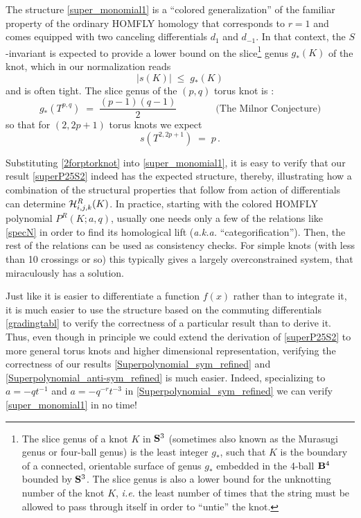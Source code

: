 \documentclass[hyper,letterpaper]{JHEP3}
\newcommand{\be}{\begin{equation}}
\newcommand{\ee}{\end{equation}}
\newcommand{\cH}{{\cal H }}
\renewcommand{\S}{{\bf S}}
\begin{document}
The structure \eqref{super_monomial1} is a ``colored generalization'' of the familiar
property of the ordinary HOMFLY homology \cite{DGR} that corresponds to $r=1$
and comes equipped with two canceling differentials $d_1$ and $d_{-1}$.
In that context, the $S$-invariant is expected to provide a lower bound on
the slice\footnote{The slice genus of a knot $K$ in $\S^3$ (sometimes also known as the Murasugi genus or four-ball genus)
is the least integer $g_*$, such that $K$ is the boundary of a connected, orientable surface of genus $g_*$
embedded in the 4-ball ${\bf B}^4$ bounded by $\S^3$. The slice genus is also a lower bound for the unknotting number
of the knot $K$, {\it i.e.} the least number of times that the string must be allowed to pass through itself
in order to ``untie'' the knot.} genus $g_* (K)$ of the knot, which in our normalization reads
\be
|s (K)| \; \le \; g_* (K)
\ee
and is often tight.
The slice genus of the $(p,q)$ torus knot is \cite{MilnorSing,Rasmussen}:
$$
g_* (T^{p,q}) \; = \; \frac{(p-1)(q-1)}{2}
\qquad\qquad
\text{(The Milnor Conjecture)}
$$
so that for $(2,2p+1)$ torus knots we expect
\be
s (T^{2,2p+1}) \; = \; p \,.
\label{2forptorknot}
\ee

Substituting \eqref{2forptorknot} into \eqref{super_monomial1}, it is easy to verify that
our result \eqref{superP25S2} indeed has the expected structure, thereby, illustrating how a combination
of the structural properties that follow from action of differentials can determine $\cH^{R}_{i,j,k} (K)$.
In practice, starting with the colored HOMFLY polynomial $P^R (K;a,q)$, usually one needs only a few of
the relations like \eqref{specN} in order to find its homological lift ({\it a.k.a.} ``categorification'').
Then, the rest of the relations can be used as consistency checks.
For simple knots (with less than 10 crossings or so) this typically gives a largely overconstrained system,
that miraculously has a solution.

Just like it is easier to differentiate a function $f(x)$ rather than to integrate it,
it is much easier to use the structure based on the commuting differentials \eqref{gradingtabl}
to verify the correctness of a particular result than to derive it.
Thus, even though in principle we could extend the derivation of \eqref{superP25S2}
to more general torus knots and higher dimensional representation,
verifying the correctness of our results \eqref{Superpolynomial_sym_refined} and \eqref{Superpolynomial_anti-sym_refined}
is much easier.
Indeed, specializing to $a = - q t^{-1}$ and $a = - q^{-r} t^{-3}$ in \eqref{Superpolynomial_sym_refined}
we can verify \eqref{super_monomial1} in no time!
\end{document}
